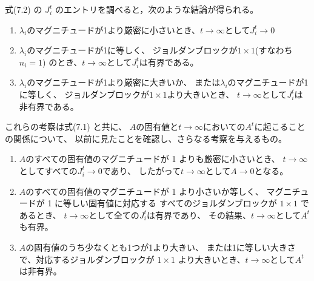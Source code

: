 \documentclass{jsarticle}
\begin{document}
式(7.2) の $J^t_i$ のエントリを調べると，次のような結論が得られる。
\begin{enumerate}
  \item $\lambda_i$のマグニチュードが1より厳密に小さいとき、$t\rightarrow \infty$として$J^t_i\rightarrow 0$
  \item $\lambda_i$のマグニチュードが1に等しく、
  ジョルダンブロックが$1\times 1$(すなわち$n_i = 1$)
  のとき、$t\rightarrow \infty$として$J^t_i$は有界である。
  \item $\lambda_i$のマグニチュードが1より厳密に大きいか、
  または$\lambda_i$のマグニチュードが1に等しく、
  ジョルダンブロックが$1\times 1$より大きいとき、
  $t\rightarrow \infty$として$J^t_i$は非有界である。

\end{enumerate}

これらの考察は式(7.1) と共に、
$A$の固有値と$t\rightarrow \infty$においての$A^t$に起こること
の関係について、
以前に見たことを確認し、さらなる考察を与えるもの。

\begin{enumerate}
  \item $A$のすべての固有値のマグニチュードが 1 よりも厳密に小さいとき、
  $t\rightarrow \infty$としてすべての$J^t_i\rightarrow 0$であり、
  したがって$t\rightarrow \infty$として$A \rightarrow 0 $となる。
  \item $A$のすべての固有値のマグニチュードが 1 より小さいか等しく、
  マグニチュードが 1 に等しい固有値に対応する
  すべてのジョルダンブロックが $1 \times 1$ であるとき、
  $t\rightarrow \infty$として全ての$J^t_i$は有界であり、
  その結果、$t\rightarrow \infty$として$A^t$も有界。
  \item $A$の固有値のうち少なくとも1つが1より大きい、
  または1に等しい大きさで、対応するジョルダンブロックが
  $1 \times 1$ より大きいとき、$t\rightarrow \infty$として$A^t$は非有界。


\end{enumerate}
\end{document}
